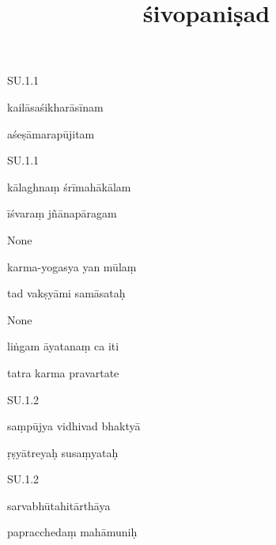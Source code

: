 \documentclass{article}
\title{śivopaniṣad}
\author{}
\begin{document}
\maketitle


    
	
	    
		SU.1.1 
    
	    
		kailāsaśikharāsīnam 
    
	    
		aśeṣāmarapūjitam 
    

    
	
	    
		SU.1.1 
    
	    
		kālaghnaṃ śrīmahākālam 
    
	    
		īśvaraṃ jñānapāragam 
    

    
	
	    
		None 
    
	    
		karma-yogasya yan mūlaṃ 
    
	    
		tad vakṣyāmi samāsataḥ 
    

    
	
	    
		None 
    
	    
		liṅgam āyatanaṃ ca iti 
    
	    
		tatra karma pravartate 
    

    
	
	    
		SU.1.2 
    
	    
		saṃpūjya vidhivad bhaktyā 
    
	    
		ṛṣyātreyaḥ susaṃyataḥ 
    

    
	
	    
		SU.1.2 
    
	    
		sarvabhūtahitārthāya 
    
	    
		papracchedaṃ mahāmuniḥ 
    
\end{document}
